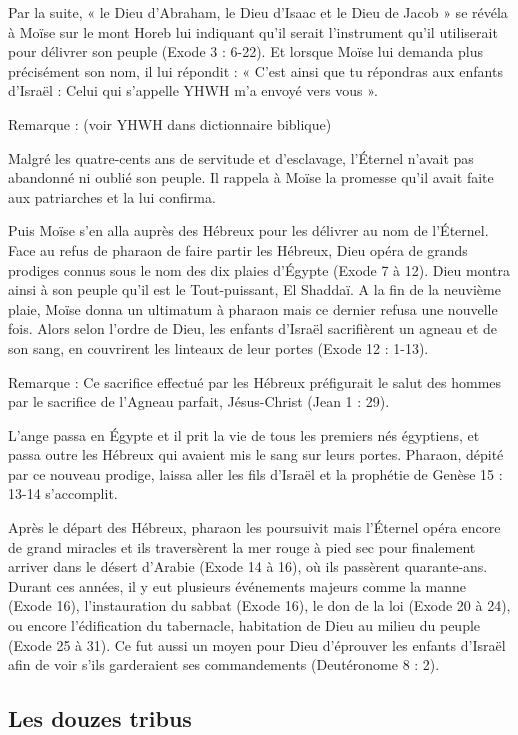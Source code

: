 Par la suite, « le Dieu d'Abraham, le Dieu d'Isaac et le Dieu de Jacob » se révéla à Moïse sur le mont Horeb lui indiquant qu'il serait l'instrument qu'il utiliserait pour délivrer son peuple (Exode 3 : 6-22). Et lorsque Moïse lui demanda plus précisément son nom, il lui répondit : « C'est ainsi que tu répondras aux enfants d'Israël : Celui qui s'appelle YHWH m'a envoyé vers vous ».

Remarque : (voir YHWH dans dictionnaire biblique)

Malgré les quatre-cents ans de servitude et d'esclavage, l’Éternel n'avait pas abandonné ni oublié son peuple. Il rappela à Moïse la promesse qu'il avait faite aux patriarches et la lui confirma.

Puis Moïse s'en alla auprès des Hébreux pour les délivrer au nom de l’Éternel. Face au refus de pharaon de faire partir les Hébreux, Dieu opéra de grands prodiges connus sous le nom des dix plaies d’Égypte (Exode 7 à 12). Dieu montra ainsi à son peuple qu'il est le Tout-puissant, El Shaddaï. A la fin de la neuvième plaie, Moïse donna un ultimatum à pharaon mais ce dernier refusa une nouvelle fois. Alors selon l'ordre de Dieu, les enfants d'Israël sacrifièrent un agneau et de son sang, en couvrirent les linteaux de leur portes (Exode 12 : 1-13).

Remarque : Ce sacrifice effectué par les Hébreux préfigurait le salut des hommes par le sacrifice de l'Agneau parfait, Jésus-Christ (Jean 1 : 29).

L'ange passa en Égypte et il prit la vie de tous les premiers nés égyptiens, et passa outre les Hébreux qui avaient mis le sang sur leurs portes. Pharaon, dépité par ce nouveau prodige, laissa aller les fils d'Israël et la prophétie de Genèse 15 : 13-14 s'accomplit.

Après le départ des Hébreux, pharaon les poursuivit mais l’Éternel opéra encore de grand miracles et ils traversèrent la mer rouge à pied sec pour finalement arriver dans le désert d'Arabie (Exode 14 à 16), où ils passèrent quarante-ans. Durant ces années, il y eut plusieurs événements majeurs comme la manne (Exode 16), l'instauration du sabbat (Exode 16), le don de la loi (Exode 20 à 24), ou encore l'édification du tabernacle, habitation de Dieu au milieu du peuple (Exode 25 à 31). Ce fut aussi un moyen pour Dieu d'éprouver les enfants d'Israël afin de voir s'ils garderaient ses commandements (Deutéronome 8 : 2).

\subsection*{Les douzes tribus}

